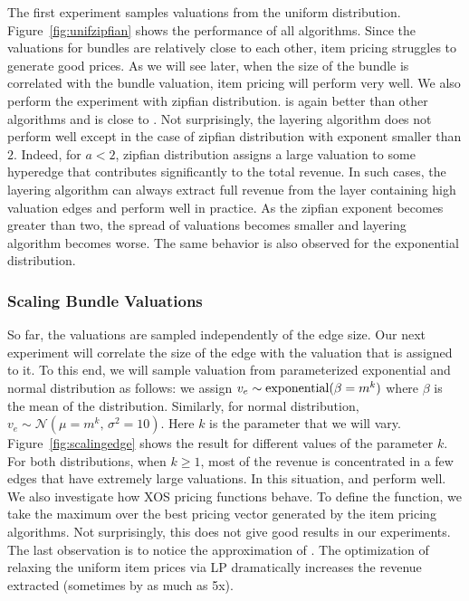 \smallskip
{} The first experiment samples valuations from the uniform distribution. Figure~\ref{fig:unifzipfian} shows the performance of all algorithms. Since the valuations for bundles are relatively close to each other, item pricing struggles to generate good prices. As we will see later, when the size of the bundle is correlated with the bundle valuation, item pricing will perform very well.  We also perform the experiment with zipfian distribution. \lpip is again better than other algorithms and \ubp is close to \lpip. Not surprisingly, the layering algorithm does not perform well except in the case of zipfian distribution with exponent smaller than $2$. Indeed, for $a < 2$, zipfian distribution assigns a large valuation to some hyperedge that contributes significantly to the total revenue. In such cases, the layering algorithm can always extract full revenue from the layer containing high valuation edges and perform well in practice. As the zipfian exponent becomes greater than two, the spread of valuations becomes smaller and layering algorithm becomes worse. The same behavior is also observed for the exponential distribution. 

\subsubsection{Scaling Bundle Valuations} So far, the valuations are sampled independently of the edge size. Our next experiment will correlate the size of the edge with the valuation that is assigned to it. To this end, we will sample valuation from parameterized exponential and normal distribution as follows: we assign $v_e \sim {\rm exponential}(\beta = m^k)$ where $\beta$ is the mean of the distribution. Similarly, for normal distribution, $v_e \sim \mathcal{N}(\mu = m^k,\, \sigma^2 = 10)$. Here $k$ is the parameter that we will vary. Figure~\ref{fig:scalingedge} shows the result for different values of the parameter $k$. For both distributions, when $k \geq 1$, most of the revenue is concentrated in a few edges that have extremely large valuations. In this situation, \lpip and \ubp perform well. We also investigate how XOS pricing functions behave. To define the function, we take the maximum over the best pricing vector generated by the item pricing algorithms. Not surprisingly, this does not give good results in our experiments. The last observation is to notice the approximation of \uip. The optimization of relaxing the uniform item prices via  LP dramatically increases the revenue extracted (sometimes by as much as 5x).


